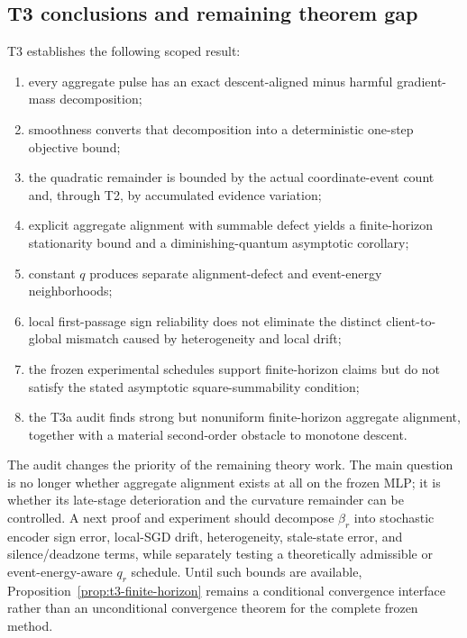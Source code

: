 \subsection{T3 conclusions and remaining theorem gap}

T3 establishes the following scoped result:
\begin{enumerate}
    \item every aggregate pulse has an exact descent-aligned minus harmful
    gradient-mass decomposition;
    \item smoothness converts that decomposition into a deterministic
    one-step objective bound;
    \item the quadratic remainder is bounded by the actual coordinate-event
    count and, through T2, by accumulated evidence variation;
    \item explicit aggregate alignment with summable defect yields a
    finite-horizon stationarity bound and a diminishing-quantum asymptotic
    corollary;
    \item constant $q$ produces separate alignment-defect and event-energy
    neighborhoods;
    \item local first-passage sign reliability does not eliminate the distinct
    client-to-global mismatch caused by heterogeneity and local drift;
    \item the frozen experimental schedules support finite-horizon claims but
    do not satisfy the stated asymptotic square-summability condition;
    \item the T3a audit finds strong but nonuniform finite-horizon aggregate
    alignment, together with a material second-order obstacle to monotone
    descent.
\end{enumerate}

The audit changes the priority of the remaining theory work.  The main question
is no longer whether aggregate alignment exists at all on the frozen MLP; it is
whether its late-stage deterioration and the curvature remainder can be
controlled.  A next proof and experiment should decompose $\beta_r$ into
stochastic encoder sign error, local-SGD drift, heterogeneity, stale-state
error, and silence/deadzone terms, while separately testing a theoretically
admissible or event-energy-aware $q_r$ schedule.  Until such bounds are
available, Proposition~\ref{prop:t3-finite-horizon} remains a conditional
convergence interface rather than an unconditional convergence theorem for the
complete frozen method.
